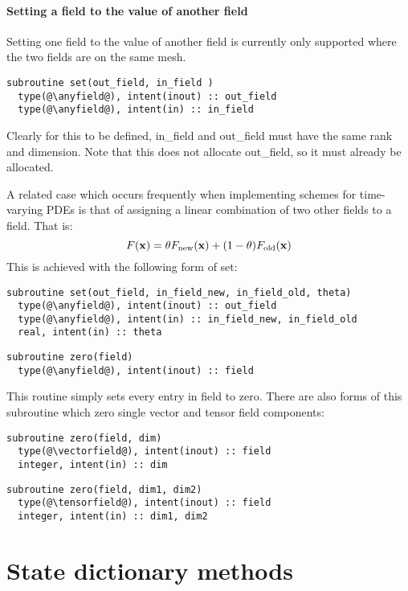 \documentclass[a4paper, 11pt]{book}
\begin{document}
\subsubsection{Setting a field to the value of another field}

Setting one field to the value of another field is currently only supported
where the two fields are on the same mesh. 
\begin{lstlisting}
subroutine set(out_field, in_field )
  type(@\anyfield@), intent(inout) :: out_field
  type(@\anyfield@), intent(in) :: in_field
\end{lstlisting}
Clearly for this to be defined, in\_field and out\_field must have the same
rank and dimension. Note that this does not allocate out\_field, so it must
already be allocated.

A related case which occurs frequently when implementing schemes for
time-varying PDEs is that of assigning a linear combination of two other
fields to a field. That is:
\begin{equation}
  F(\mathbf{x})=\theta F_{\textrm{new}}(\mathbf{x}) + (1-\theta) F_{\textrm{old}}(\mathbf{x})
\end{equation}
This is achieved with the following form of set:
\begin{lstlisting}
subroutine set(out_field, in_field_new, in_field_old, theta)
  type(@\anyfield@), intent(inout) :: out_field
  type(@\anyfield@), intent(in) :: in_field_new, in_field_old
  real, intent(in) :: theta
\end{lstlisting}


\begin{lstlisting} 
subroutine zero(field)
  type(@\anyfield@), intent(inout) :: field
\end{lstlisting}

This routine simply sets every entry in field to zero. There are also forms
of this subroutine which zero single vector and tensor field components:

\begin{lstlisting}
subroutine zero(field, dim)
  type(@\vectorfield@), intent(inout) :: field
  integer, intent(in) :: dim
\end{lstlisting}
\begin{lstlisting}
subroutine zero(field, dim1, dim2)
  type(@\tensorfield@), intent(inout) :: field
  integer, intent(in) :: dim1, dim2
\end{lstlisting}


\chapter{State dictionary methods}
\end{document}
